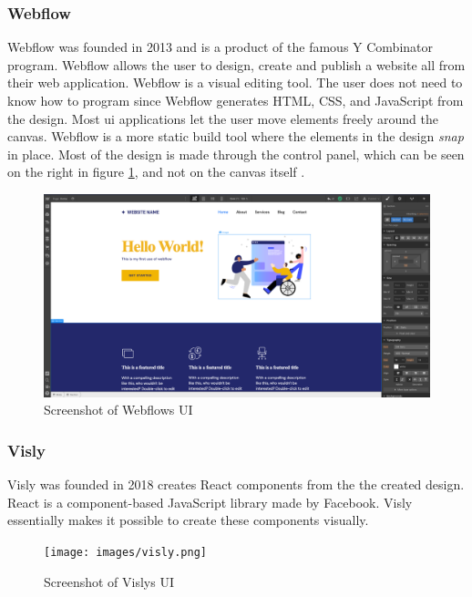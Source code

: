 \subsubsection{Webflow}
Webflow was founded in 2013 and is a product of the famous Y Combinator program\cite{Combinator}. Webflow allows the user to design, create and publish a website all from their web application. Webflow is a visual editing tool. The user does not need to know how to program since Webflow generates HTML, CSS, and JavaScript from the design. Most \acrshort{ui} applications let the user move elements freely around the canvas. Webflow is a more static build tool where the elements in the design \textit{snap} in place. Most of the design is made through the control panel, which can be seen on the right in figure \ref{fig:webflow}, and not on the canvas itself \cite{ResponsiveWebDesign}. 

\begin{figure}[H]
  \centering
  \includegraphics[width=0.8\linewidth]{images/webflow.png}
  \caption{Screenshot of Webflows UI}%
  \label{fig:webflow}
\end{figure}

\subsubsection{Visly}%
\label{ssub:Visly}
Visly was founded in 2018 creates React components \cite{facebookincReactJavaScriptLibrary} from the the created design. React is a component-based JavaScript library made by Facebook. Visly essentially makes it possible to create these components visually. 

\begin{figure}[H]
  \centering
  \texttt{[image: images/visly.png]}
  \caption{ Screenshot of Vislys UI }%
  \label{fig:visly}
\end{figure}




